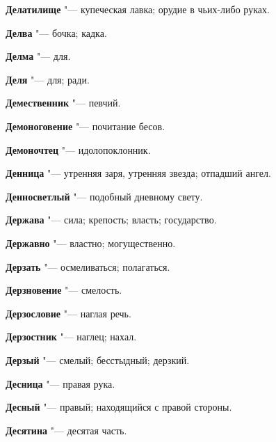 \begin{mymulticols}{2}
\noindent\textbf{Делатилище} "--- купеческая лавка; орудие в чьих-либо руках. 




\noindent\textbf{Делва} "--- бочка; кадка. 




\noindent\textbf{Делма} "--- для. 




\noindent\textbf{Деля} "--- для; ради. 




\noindent\textbf{Демественник} "--- певчий. 




\noindent\textbf{Демоноговение} "--- почитание бесов. 




\noindent\textbf{Демоночтец} "--- идолопоклонник. 




\noindent\textbf{Денница} "--- утренняя заря, утренняя звезда; отпадший ангел. 




\noindent\textbf{Денносветлый} "--- подобный дневному свету. 




\noindent\textbf{Держава} "--- сила; крепость; власть; государство. 




\noindent\textbf{Державно} "--- властно; могущественно. 




\noindent\textbf{Дерзать} "--- осмеливаться; полагаться. 




\noindent\textbf{Дерзновение} "--- смелость. 




\noindent\textbf{Дерзословие} "--- наглая речь. 




\noindent\textbf{Дерзостник} "--- наглец; нахал. 




\noindent\textbf{Дерзый} "--- смелый; бесстыдный; дерзкий. 




\noindent\textbf{Десница} "--- правая рука. 




\noindent\textbf{Десный} "--- правый; находящийся с правой стороны. 




\noindent\textbf{Десятина} "--- десятая часть. 





\end{mymulticols}
